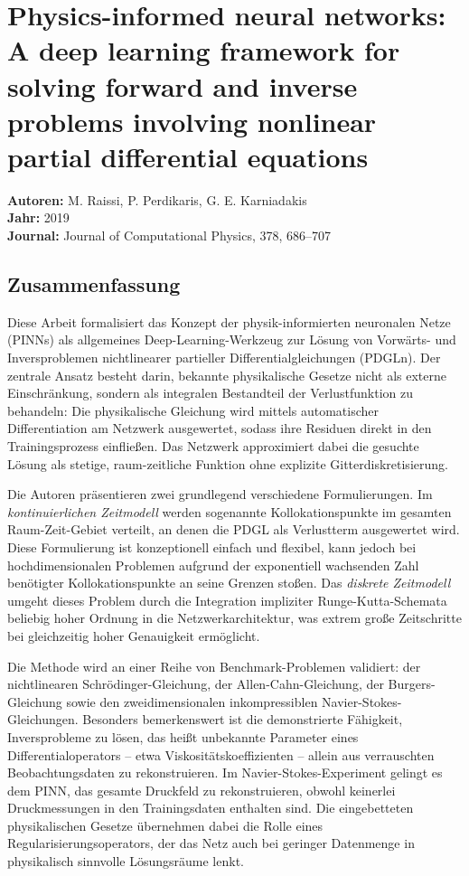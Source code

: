\documentclass[a4paper,12pt]{article}
\begin{document}
\section*{Physics-informed neural networks: A deep learning framework for solving forward
and inverse problems involving nonlinear partial differential equations}

\textbf{Autoren:} M. Raissi, P. Perdikaris, G. E. Karniadakis \\
\textbf{Jahr:} 2019 \\
\textbf{Journal:} Journal of Computational Physics, 378, 686--707

\subsection*{Zusammenfassung}

Diese Arbeit formalisiert das Konzept der physik-informierten neuronalen Netze (PINNs) als allgemeines Deep-Learning-Werkzeug zur Lösung von Vorwärts- und Inversproblemen nichtlinearer partieller Differentialgleichungen (PDGLn). Der zentrale Ansatz besteht darin, bekannte physikalische Gesetze nicht als externe Einschränkung, sondern als integralen Bestandteil der Verlustfunktion zu behandeln: Die physikalische Gleichung wird mittels automatischer Differentiation am Netzwerk ausgewertet, sodass ihre Residuen direkt in den Trainings\-prozess einfließen. Das Netzwerk approximiert dabei die gesuchte Lösung als stetige, raum-zeitliche Funktion ohne explizite Gitter\-dis\-kre\-ti\-sie\-rung.

Die Autoren präsentieren zwei grundlegend verschiedene Formulierungen. Im \textit{kontinuierlichen Zeitmodell} werden sogenannte Kollokationspunkte im gesamten Raum-Zeit-Gebiet verteilt, an denen die PDGL als Verlustterm ausgewertet wird. Diese Formulierung ist konzeptionell einfach und flexibel, kann jedoch bei hochdimensionalen Problemen aufgrund der exponentiell wachsenden Zahl benötigter Kollokationspunkte an seine Grenzen stoßen. Das \textit{diskrete Zeitmodell} umgeht dieses Problem durch die Integration impliziter Runge-Kutta-Schemata beliebig hoher Ordnung in die Netzwerkarchitektur, was extrem große Zeitschritte bei gleichzeitig hoher Genauigkeit ermöglicht.

Die Methode wird an einer Reihe von Benchmark-Problemen validiert: der nichtlinearen Schrödinger-Gleichung, der Allen-Cahn-Gleichung, der Burgers-Gleichung sowie den zweidimensionalen inkompressiblen Navier-Stokes-Gleichungen. Besonders bemerkenswert ist die demonstrierte Fähigkeit, Inversprobleme zu lösen, das heißt unbekannte Parameter eines Differentialoperators -- etwa Viskositätskoeffizienten -- allein aus verrauschten Beobachtungsdaten zu rekonstruieren. Im Navier-Stokes-Experiment gelingt es dem PINN, das gesamte Druckfeld zu rekonstruieren, obwohl keinerlei Druckmessungen in den Trainingsdaten enthalten sind. Die eingebetteten physikalischen Gesetze übernehmen dabei die Rolle eines Regularisierungsoperators, der das Netz auch bei geringer Datenmenge in physikalisch sinnvolle Lösungsräume lenkt.
\end{document}
